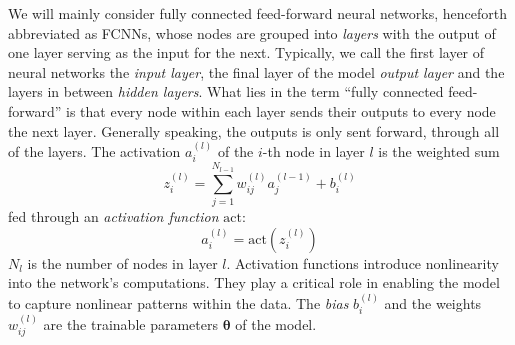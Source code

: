 \documentclass[a4paper, UKenglish, 11pt]{uiomaster}
\begin{document}
We will mainly consider fully connected feed-forward neural networks, henceforth abbreviated as FCNNs, whose nodes are grouped into \emph{layers} with the output of one layer serving as the input for the next. Typically, we call the first layer of neural networks the \emph{input layer}, the final layer of the model \emph{output layer} and the layers in between \emph{hidden layers}. What lies in the term ``fully connected feed-forward'' is that every node within each layer sends their outputs to every node the next layer. Generally speaking, the outputs is only sent forward, through all of the layers.
The activation $a_i^{(l)}$ of the $i$-th node in layer $l$ is the weighted sum
\begin{equation}
  z_i^{(l)} = \sum_{j=1}^{N_{l-1}} w_{ij}^{(l)} a_{j}^{(l-1)} + b_i^{(l)}
  \label{activation_node}
\end{equation}
fed through an \emph{activation function} \(\text{act}\):
\begin{equation}
  a_i^{(l)} = \text{act} \left( z_i^{(l)} \right)
\end{equation}
$N_{l}$ is the number of nodes in layer \(l\).
Activation functions introduce nonlinearity into the network's computations. They play a critical role in enabling the model to capture nonlinear patterns within the data. The \emph{bias} \(b_i^{(l)}\) and the weights \(w_{ij}^{(l)}\) are the trainable parameters \(\boldsymbol \theta\) of the model.



\end{document}

